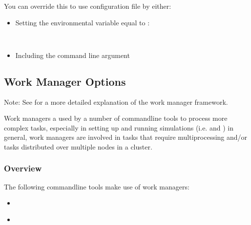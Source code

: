 \documentclass[letterpaper,10pt,english]{sphinxmanual}
\begin{document}
You can override this to use configuration file  by either:
\begin{itemize}
\item {} 
Setting the environmental variable  equal to :

\begin{sphinxVerbatim}[commandchars=\\\{\}]
 
\end{sphinxVerbatim}

\item {} 
Including the command line argument 

\end{itemize}


\subsection{Work Manager Options}
\label{\detokenize{users_guide/west_tools:work-manager-options}}
Note: See {\hyperref[\detokenize{users_guide/wwmgr:wwmgr}]{}} for a more detailed explanation of the
work manager framework.

Work managers a used by a number of command\sphinxhyphen{}line tools to process more complex
tasks, especially in setting up and running simulations (i.e. {\hyperref[\detokenize{users_guide/command_line_tools/w_init:w-init}]{}} and
{\hyperref[\detokenize{users_guide/command_line_tools/w_run:w-run}]{}}) \sphinxhyphen{} in general, work managers are involved in tasks that require
multiprocessing and/or tasks distributed over multiple nodes in a cluster.


\subsubsection{Overview}
\label{\detokenize{users_guide/west_tools:id1}}
The following command\sphinxhyphen{}line tools make use of work managers:
\begin{itemize}
\item {} 
{\hyperref[\detokenize{users_guide/command_line_tools/w_init:w-init}]{}}

\item {} 
{\hyperref[\detokenize{users_guide/command_line_tools/w_run:w-run}]{}}

\end{itemize}
\end{document}
